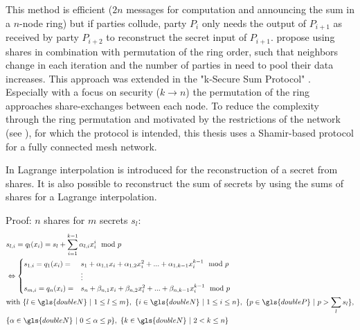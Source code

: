 This method is efficient ($2n$ messages for computation and announcing the sum in a $n$-node ring) but if parties collude, party $P_i$ only needs the output of $P_{i+1}$ as received by party $P_{i+2}$ to reconstruct the secret input of $P_{i+1}$. \textcite{Clifton2002} propose using shares in combination with permutation of the ring order, such that neighbors change in each iteration and the number of parties in need to pool their data increases. This approach was extended in the "k-Secure Sum Protocol" \autocite{Sheikh2009}. Especially with a focus on security ($k\rightarrow n$) the permutation of the ring approaches share-exchanges between each node. To reduce the complexity through the ring permutation and motivated by the restrictions of the network (see ), for which the protocol is intended, this thesis  uses a Shamir-based protocol for a fully connected mesh network. 

In  Lagrange interpolation is introduced for the reconstruction of a secret from shares. It is also possible to reconstruct the sum of secrets by using the sums of shares for a Lagrange interpolation.

Proof:
$n$ shares for $m$ secrets $s_l$:
\begin{alignat}{1}
&s_{l,i} = q_l(x_i) = s_l + \sum_{i=1}^{k-1} \alpha_{l,i} x_i^i \mod p \\
& \Leftrightarrow \begin{cases}
s_{1,i} = q_1(x_i) = & s_1 + \alpha_{1,1} x_i + \alpha_{1,2} x_i^2 + ... + \alpha_{1,k-1}x_i^{k-1} \mod p \\
&\vdots \\
s_{m,i} = q_n(x_i) = & s_n + \beta_{n,1} x_i + \beta_{n,2} x_i^2 + ... + \beta_{n,k-1}x_i^{k-1} \mod p
\end{cases} \nonumber \\
& \text{with} \ \{l \in \gls{doubleN} \ | \ 1 \leq l \leq m \},
\ \{i \in \gls{doubleN} \ | \ 1 \leq i \leq n \},
\ \{ p \in \gls{doubleP} \ | \ p > \sum_l s_l \}, \nonumber \\
&\{ \alpha \in \gls{doubleN} \ | \ 0 \leq \alpha \leq p \},
\ \{k \in \gls{doubleN} \ | \ 2 < k \leq n \} \nonumber
\end{alignat}

